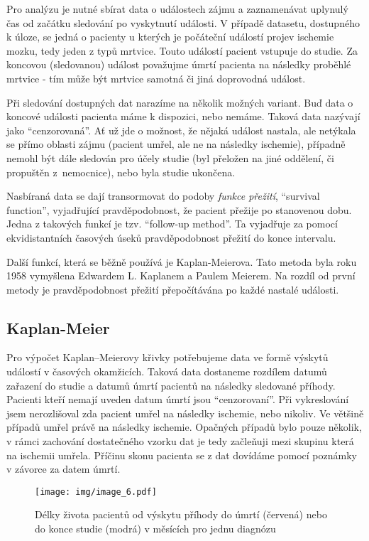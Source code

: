 Pro analýzu je nutné sbírat data o událostech zájmu a zaznamenávat uplynulý čas od začátku sledování po vyskytnutí události.
V případě datasetu, dostupného k úloze, se jedná o pacienty u kterých je počáteční událostí projev ischemie mozku, tedy jeden z typů mrtvice.
Touto událostí pacient vstupuje do studie.
Za koncovou (sledovanou) událost považujme úmrtí pacienta na následky proběhlé mrtvice - tím může být mrtvice samotná či jiná doprovodná událost.

Při sledování dostupných dat narazíme na několik možných variant.
Buď data o koncové události pacienta máme k dispozici, nebo nemáme.
Taková data nazývají jako \enquote{cenzorovaná}.
Ať už jde o možnost, že nějaká událost nastala, ale netýkala se přímo oblasti zájmu (pacient umřel, ale ne na následky ischemie), případně nemohl být dále sledován pro účely studie (byl přeložen na jiné oddělení, či propuštěn z~nemocnice), nebo byla studie ukončena.

Nasbíraná data se dají transormovat do podoby \textit{funkce přežití}, \enquote{survival function}, vyjadřující pravděpodobnost, že pacient přežije po stanovenou dobu.
Jedna z takových funkcí je tzv. \enquote{follow-up method}.
Ta vyjadřuje za pomocí ekvidistantních časových úseků pravděpodobnost přežití do konce intervalu.

Další funkcí, která se běžně používá je Kaplan-Meierova.
Tato metoda byla roku 1958 vymyšlena Edwardem L. Kaplanem a Paulem Meierem.
Na rozdíl od první metody je pravděpodobnost přežití přepočítávána po každé nastalé události.

\subsection{Kaplan-Meier}

Pro výpočet Kaplan–Meierovy křivky potřebujeme data ve formě výskytů událostí v časových okamžicích.
Taková data dostaneme rozdílem datumů zařazení do studie a datumů úmrtí pacientů na následky sledované příhody.
Pacienti kteří nemají uveden datum úmrtí jsou \enquote{cenzorovaní}.
Při vykreslování jsem nerozlišoval zda pacient umřel na následky ischemie, nebo nikoliv.
Ve většině případů umřel právě na následky ischemie.
Opačných případů bylo pouze několik, v rámci zachování dostatečného vzorku dat je tedy začleňuji mezi skupinu která na ischemii umřela.
Příčinu skonu pacienta se z dat dovídáme pomocí poznámky v závorce za datem úmrtí.

\begin{figure}[htbp]
    \texttt{[image: img/image\_6.pdf]}
    \centering
    \caption{Délky života pacientů od výskytu příhody do úmrtí (červená) nebo do konce studie (modrá) v měsících pro jednu diagnózu}
    \label{img:lifelines}
\end{figure}
\FloatBarrier

